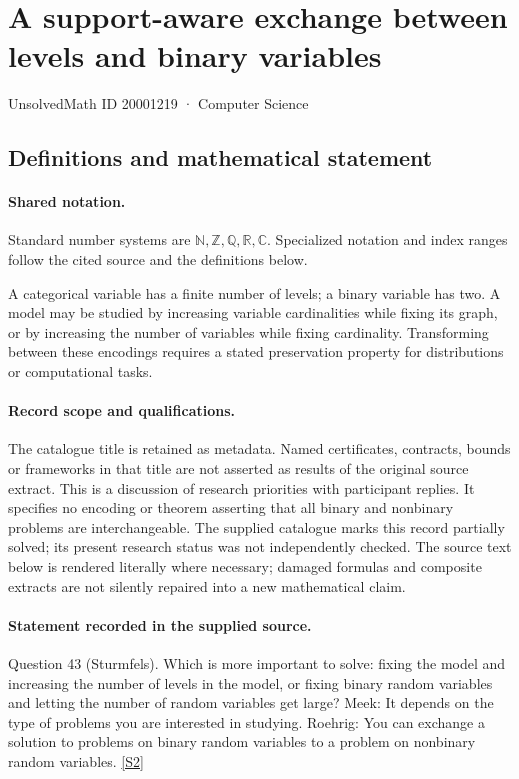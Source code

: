 \documentclass[11pt]{article}
\newcommand{\sref}[2]{\hyperlink{source:#1:#2}{[S#2]}}
\begin{document}
\setcounter{section}{20001218}
\section{A support-aware exchange between levels and binary variables}\label{20001219}
{\small\sffamily UnsolvedMath ID 20001219 · Computer Science}
\subsection{Definitions and mathematical statement}

\paragraph{Shared notation.}Standard number systems are $\mathbb N,\mathbb Z,\mathbb Q,\mathbb R,\mathbb C$. Specialized notation and index ranges follow the cited source and the definitions below.


A categorical variable has a finite number of levels; a binary variable has two. A model may be studied by increasing variable cardinalities while fixing its graph, or by increasing the number of variables while fixing cardinality. Transforming between these encodings requires a stated preservation property for distributions or computational tasks.
\paragraph{Record scope and qualifications.}
The catalogue title is retained as metadata. Named certificates, contracts, bounds or frameworks in that title are not asserted as results of the original source extract.
This is a discussion of research priorities with participant replies. It specifies no encoding or theorem asserting that all binary and nonbinary problems are interchangeable. The supplied catalogue marks this record partially solved; its present research status was not independently checked.
The source text below is rendered literally where necessary; damaged formulas and composite extracts are not silently repaired into a new mathematical claim.
\paragraph{Statement recorded in the supplied source.}
Question 43 (Sturmfels). Which is more important to solve: fixing the model and increasing the number of levels in the model, or fixing binary random variables and letting the number of random variables get large? Meek: It depends on the type of problems you are interested in studying. Roehrig: You can exchange a solution to problems on binary random variables to a problem on nonbinary random variables. \sref{20001219}{2}
\end{document}
